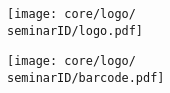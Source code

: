 \documentclass[12pt, oneside]{article}
\begin{document}
            
    \loadTearoffStyle
    \begin{center}
        
        \vspace*{20mm}
        \texttt{[image: core/logo/\\seminarID/logo.pdf]}
        \vfill
        \fontsize{60}{25}\selectfont
        \currentYear
    \end{center}
    \newpage        
    \begin{center}
        \null
        \vfill
        \texttt{[image: core/logo/\\seminarID/barcode.pdf]}
    \end{center}
\end{document}

